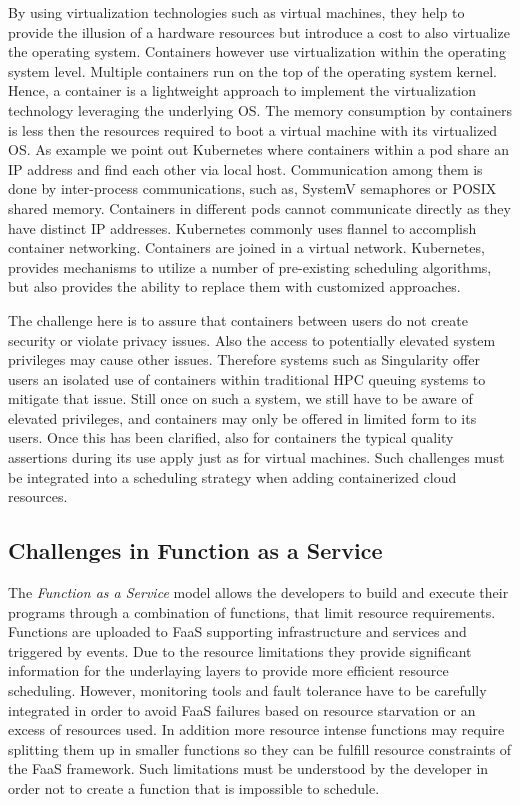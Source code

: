 \documentclass[final,5p,times,twocolumn]{elsarticle}
\begin{document}
By using virtualization technologies such as virtual machines, they
help to provide the illusion of a hardware resources but introduce a
cost to also virtualize the operating system. Containers however use
virtualization within the operating system level. Multiple containers
run on the top of the operating system kernel. Hence, a container is a
lightweight approach to implement the virtualization technology
leveraging the underlying OS. The memory consumption by containers is
less then the resources required to boot a virtual machine with its
virtualized OS. As example we point out Kubernetes \cite{Kuber2018}
where containers within a pod \cite{Kubernates2018} share an IP
address and find each other via local host. Communication among them
is done by inter-process communications, such as, SystemV semaphores
or POSIX shared memory. Containers in different pods cannot
communicate directly as they have distinct IP addresses. Kubernetes
commonly uses flannel to accomplish container networking. Containers
are joined in a virtual network. Kubernetes, provides mechanisms to
utilize a number of pre-existing scheduling algorithms, but also
provides the ability to replace them with customized approaches.

The challenge here is to assure that containers between users do not
create security or violate privacy issues. Also the access to
potentially elevated system privileges may cause other issues.
Therefore systems such as Singularity offer users an isolated use of
containers within traditional HPC queuing systems to mitigate that
issue. Still once on such a system, we still have to be aware of
elevated privileges, and containers may only be offered in limited
form to its users. Once this has been clarified, also for containers
the typical quality assertions during its use apply just as for
virtual machines. Such challenges must be integrated into a scheduling
strategy when adding containerized cloud resources.


\subsection{Challenges in Function as a Service}

The {\em Function as a Service} model allows the developers to build
and execute their programs through a combination of functions, that
limit resource requirements. Functions are uploaded to FaaS supporting
infrastructure and services and triggered by events. Due to the
resource limitations they provide significant information for the
underlaying layers to provide more efficient resource scheduling.
However, monitoring tools and fault tolerance have to be carefully
integrated in order to avoid FaaS failures based on resource
starvation or an excess of resources used. In addition more resource
intense functions may require splitting them up in smaller functions
so they can be fulfill resource constraints of the FaaS framework.
Such limitations must be understood by the developer in order not to
create a function that is impossible to schedule.
\end{document}
